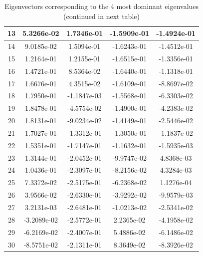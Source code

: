 \documentclass{article}
\begin{document}
\begin{table}[h!]
\begin{tabular}{|c|c|c|c|c|}
13 & 5.3266e-02 & 1.7346e-01 & -1.5909e-01 & -1.4924e-01 \\ 
\hline                                                      
14 & 9.0185e-02 & 1.5094e-01 & -1.6243e-01 & -1.4512e-01 \\ 
\hline                                                      
15 & 1.2164e-01 & 1.2155e-01 & -1.6515e-01 & -1.3356e-01 \\ 
\hline                                                      
16 & 1.4721e-01 & 8.5364e-02 & -1.6440e-01 & -1.1318e-01 \\ 
\hline                                                      
17 & 1.6676e-01 & 4.3515e-02 & -1.6109e-01 & -8.8697e-02 \\ 
\hline                                                      
18 & 1.7950e-01 & -1.1847e-03 & -1.5568e-01 & -6.3303e-02 \\
\hline                                                      
19 & 1.8478e-01 & -4.5754e-02 & -1.4900e-01 & -4.2383e-02 \\
\hline                                                      
20 & 1.8131e-01 & -9.0234e-02 & -1.4149e-01 & -2.5446e-02 \\
\hline                                                      
21 & 1.7027e-01 & -1.3312e-01 & -1.3050e-01 & -1.1837e-02 \\
\hline                                                      
22 & 1.5351e-01 & -1.7147e-01 & -1.1632e-01 & -1.5935e-03 \\
\hline                                                      
23 & 1.3144e-01 & -2.0452e-01 & -9.9747e-02 & 4.8368e-03 \\ 
\hline                                                      
24 & 1.0436e-01 & -2.3097e-01 & -8.2156e-02 & 4.3284e-03 \\ 
\hline                                                      
25 & 7.3372e-02 & -2.5175e-01 & -6.2368e-02 & 1.1276e-04 \\ 
\hline                                                      
26 & 3.9566e-02 & -2.6330e-01 & -3.9292e-02 & -9.9579e-03 \\
\hline                                                      
27 & 3.2131e-03 & -2.6481e-01 & -1.0213e-02 & -2.5341e-02 \\
\hline                                                      
28 & -3.2089e-02 & -2.5772e-01 & 2.2365e-02 & -4.1958e-02 \\
\hline                                                      
29 & -6.2169e-02 & -2.4007e-01 & 5.4886e-02 & -6.1486e-02 \\
\hline                                                      
30 & -8.5751e-02 & -2.1311e-01 & 8.3649e-02 & -8.3926e-02 \\
\hline                                           
\end{tabular}                                               
\caption{Eigenvectors corresponding to the 4 most dominant eigenvalues (continued in next table)}                                    
\label{table:MyTableLa22bel}                                  
\end{table} 
\end{document}
